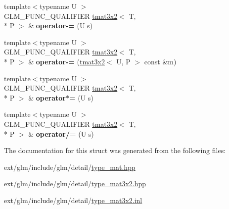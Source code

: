 \begin{DoxyCompactItemize}
\item 
\hypertarget{structglm_1_1tmat3x2_a94092701c91edec5ab93035af7a3422b}{{\footnotesize template$<$typename U $>$ }\\G\-L\-M\-\_\-\-F\-U\-N\-C\-\_\-\-Q\-U\-A\-L\-I\-F\-I\-E\-R \hyperlink{structglm_1_1tmat3x2}{tmat3x2}$<$ T, \\*
P $>$ \& {\bfseries operator-\/=} (U s)}\label{structglm_1_1tmat3x2_a94092701c91edec5ab93035af7a3422b}

\item 
\hypertarget{structglm_1_1tmat3x2_a192437e717b337e5dead355382eb0fa4}{{\footnotesize template$<$typename U $>$ }\\G\-L\-M\-\_\-\-F\-U\-N\-C\-\_\-\-Q\-U\-A\-L\-I\-F\-I\-E\-R \hyperlink{structglm_1_1tmat3x2}{tmat3x2}$<$ T, \\*
P $>$ \& {\bfseries operator-\/=} (\hyperlink{structglm_1_1tmat3x2}{tmat3x2}$<$ U, P $>$ const \&m)}\label{structglm_1_1tmat3x2_a192437e717b337e5dead355382eb0fa4}

\item 
\hypertarget{structglm_1_1tmat3x2_ae9ca1018839d8c718c7bdd0fa2d808ff}{{\footnotesize template$<$typename U $>$ }\\G\-L\-M\-\_\-\-F\-U\-N\-C\-\_\-\-Q\-U\-A\-L\-I\-F\-I\-E\-R \hyperlink{structglm_1_1tmat3x2}{tmat3x2}$<$ T, \\*
P $>$ \& {\bfseries operator$\ast$=} (U s)}\label{structglm_1_1tmat3x2_ae9ca1018839d8c718c7bdd0fa2d808ff}

\item 
\hypertarget{structglm_1_1tmat3x2_a9c34c87d7b9be6e3301bc8e9186c96bf}{{\footnotesize template$<$typename U $>$ }\\G\-L\-M\-\_\-\-F\-U\-N\-C\-\_\-\-Q\-U\-A\-L\-I\-F\-I\-E\-R \hyperlink{structglm_1_1tmat3x2}{tmat3x2}$<$ T, \\*
P $>$ \& {\bfseries operator/=} (U s)}\label{structglm_1_1tmat3x2_a9c34c87d7b9be6e3301bc8e9186c96bf}

\end{DoxyCompactItemize}


The documentation for this struct was generated from the following files\-:\begin{DoxyCompactItemize}
\item 
ext/glm/include/glm/detail/\hyperlink{type__mat_8hpp}{type\-\_\-mat.\-hpp}\item 
ext/glm/include/glm/detail/\hyperlink{type__mat3x2_8hpp}{type\-\_\-mat3x2.\-hpp}\item 
ext/glm/include/glm/detail/\hyperlink{type__mat3x2_8inl}{type\-\_\-mat3x2.\-inl}\end{DoxyCompactItemize}
